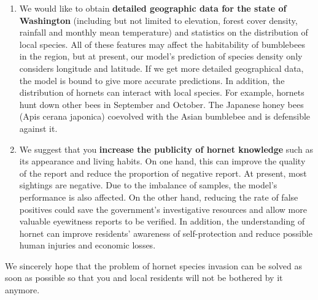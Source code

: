 \documentclass[12pt]{article}
\begin{document}
\begin{enumerate}[\bf 1.]
	\item We would like to obtain \textbf{detailed geographic data for the state of Washington} (including but not limited to elevation, forest cover density, rainfall and monthly mean temperature) and statistics on the distribution of local species.  All of these features may affect the habitability of bumblebees in the region, but at present, our model's prediction of species density only considers longitude and latitude. If we get more detailed geographical data, the model is bound to give more accurate predictions. In addition, the distribution of hornets can interact with local species. For example, hornets hunt down other bees in September and October. The Japanese honey bees (Apis cerana japonica) coevolved with the Asian bumblebee and is defensible against it.
	\item We suggest that you \textbf{increase the publicity of hornet knowledge} such as its appearance and living habits. On one hand, this can improve the quality of the report and reduce the proportion of negative report. At present, most sightings are negative. Due to the imbalance of samples, the model's performance is also affected. On the other hand, reducing the rate of false positives could save the government's investigative resources and allow more valuable eyewitness reports to be verified. In addition, the understanding of hornet can improve residents' awareness of self-protection and reduce possible human injuries and economic losses.
\end{enumerate}
We sincerely hope that the problem of hornet species invasion can be solved as soon as possible so that you and local residents will not be bothered by it anymore.
\clearpage
\end{document}
